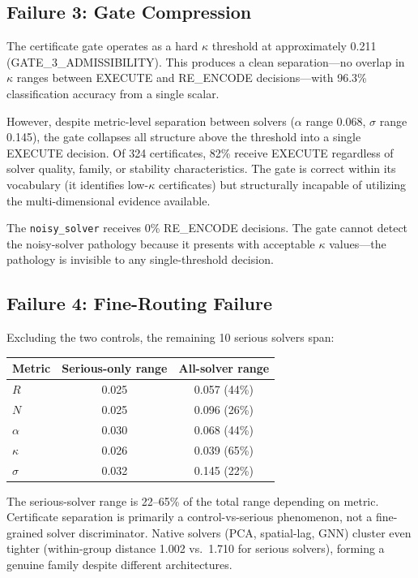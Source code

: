 \documentclass{article}
\begin{document}
\subsection{Failure 3: Gate Compression}

The certificate gate operates as a hard $\kappa$ threshold at approximately 0.211 (GATE\_3\_ADMISSIBILITY). This produces a clean separation---no overlap in $\kappa$ ranges between EXECUTE and RE\_ENCODE decisions---with 96.3\% classification accuracy from a single scalar.

However, despite metric-level separation between solvers ($\alpha$ range 0.068, $\sigma$ range 0.145), the gate collapses all structure above the threshold into a single EXECUTE decision. Of 324 certificates, 82\% receive EXECUTE regardless of solver quality, family, or stability characteristics. The gate is correct within its vocabulary (it identifies low-$\kappa$ certificates) but structurally incapable of utilizing the multi-dimensional evidence available.

The \texttt{noisy\_solver} receives 0\% RE\_ENCODE decisions. The gate cannot detect the noisy-solver pathology because it presents with acceptable $\kappa$ values---the pathology is invisible to any single-threshold decision.

\subsection{Failure 4: Fine-Routing Failure}

Excluding the two controls, the remaining 10 serious solvers span:
\begin{center}
\small
\begin{tabular}{lcc}
\toprule
Metric & Serious-only range & All-solver range \\
\midrule
$R$ & 0.025 & 0.057 (44\%) \\
$N$ & 0.025 & 0.096 (26\%) \\
$\alpha$ & 0.030 & 0.068 (44\%) \\
$\kappa$ & 0.026 & 0.039 (65\%) \\
$\sigma$ & 0.032 & 0.145 (22\%) \\
\bottomrule
\end{tabular}
\end{center}

The serious-solver range is 22--65\% of the total range depending on metric. Certificate separation is primarily a control-vs-serious phenomenon, not a fine-grained solver discriminator. Native solvers (PCA, spatial-lag, GNN) cluster even tighter (within-group distance 1.002 vs.\ 1.710 for serious solvers), forming a genuine family despite different architectures.
\end{document}
